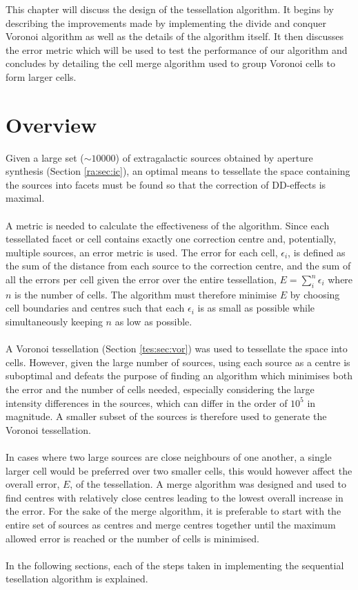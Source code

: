 This chapter will discuss the design of the tessellation algorithm. It begins by describing the improvements made by implementing the divide and conquer Voronoi algorithm as well as the details of the algorithm itself. It then discusses the error metric which will be used to test the performance of our algorithm and concludes by detailing the cell merge algorithm used to group Voronoi cells to form larger cells.
\section{Overview}
Given a large set ($\sim10000$) of extragalactic sources obtained by aperture synthesis (Section \ref{ra:sec:ic}), an optimal means to tessellate the space containing the sources into facets must be found so that the correction of DD-effects is maximal.
\\
\\
A metric is needed to calculate the effectiveness of the algorithm. Since each tessellated facet or cell contains exactly one correction centre and, potentially, multiple sources, an error metric is used. The error for each cell, $\epsilon_i$, is defined as the sum of the distance from each source to the correction centre, and the sum of all the errors per cell given the error over the entire tessellation, $E = \sum^n_i \epsilon_i$ where $n$ is the number of cells. The algorithm must therefore minimise $E$ by choosing cell boundaries and centres such that each $\epsilon_i$ is as small as possible while simultaneously keeping $n$ as low as possible.
\\
\\
A Voronoi tessellation (Section \ref{tes:sec:vor}) was used to tessellate the space into cells. However, given the large number of sources, using each source as a centre is suboptimal and defeats the purpose of finding an algorithm which minimises both the error and the number of cells needed, especially considering the large intensity differences in the sources, which can differ in the order of $10^5$ in magnitude. A smaller subset of the sources is therefore used to generate the Voronoi tessellation.
\\
\\
In cases where two large sources are close neighbours of one another, a single larger cell would be preferred over two smaller cells, this would however affect the overall error, $E$, of the tessellation. A merge algorithm was designed and used to find centres with relatively close centres leading to the lowest overall increase in the error. For the sake of the merge algorithm, it is preferable to start with the entire set of sources as centres and merge centres together until the maximum allowed error is reached or the number of cells is minimised.
\\
\\
In the following sections, each of the steps taken in implementing the sequential tesellation algorithm is explained.